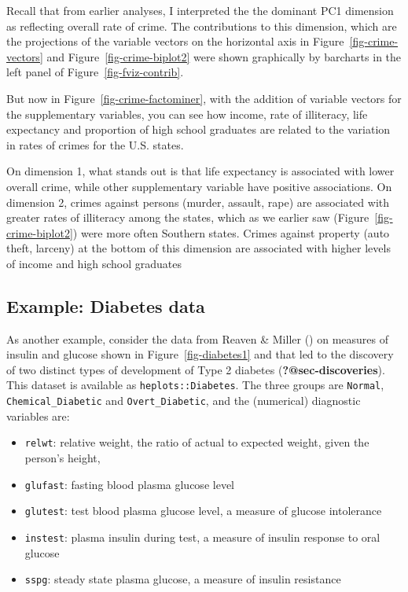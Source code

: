 \documentclass[
  letterpaper,
  10pt,
  krantz2]{krantz}
\providecommand{\tightlist}{%
  \setlength{\itemsep}{0pt}\setlength{\parskip}{0pt}}\usepackage{longtable,booktabs,array}
\begin{document}
Recall that from earlier analyses, I interpreted the the dominant PC1
dimension as reflecting overall rate of crime. The contributions to this
dimension, which are the projections of the variable vectors on the
horizontal axis in Figure~\ref{fig-crime-vectors} and
Figure~\ref{fig-crime-biplot2} were shown graphically by barcharts in
the left panel of Figure~\ref{fig-fviz-contrib}.

But now in Figure~\ref{fig-crime-factominer}, with the addition of
variable vectors for the supplementary variables, you can see how
income, rate of illiteracy, life expectancy and proportion of high
school graduates are related to the variation in rates of crimes for the
U.S. states.

On dimension 1, what stands out is that life expectancy is associated
with lower overall crime, while other supplementary variable have
positive associations. On dimension 2, crimes against persons (murder,
assault, rape) are associated with greater rates of illiteracy among the
states, which as we earlier saw (Figure~\ref{fig-crime-biplot2}) were
more often Southern states. Crimes against property (auto theft,
larceny) at the bottom of this dimension are associated with higher
levels of income and high school graduates

\subsection{Example: Diabetes data}\label{example-diabetes-data}

As another example, consider the data from Reaven \& Miller
() on measures of insulin and
glucose shown in Figure~\ref{fig-diabetes1} and that led to the
discovery of two distinct types of development of Type 2 diabetes
(\textbf{?@sec-discoveries}). This dataset is available as
\texttt{heplots::Diabetes}. The three groups are \texttt{Normal},
\texttt{Chemical\_Diabetic} and \texttt{Overt\_Diabetic}, and the
(numerical) diagnostic variables are:

\begin{itemize}
\tightlist
\item
  \texttt{relwt}: relative weight, the ratio of actual to expected
  weight, given the person's height,
\item
  \texttt{glufast}: fasting blood plasma glucose level
\item
  \texttt{glutest}: test blood plasma glucose level, a measure of
  glucose intolerance
\item
  \texttt{instest}: plasma insulin during test, a measure of insulin
  response to oral glucose
\item
  \texttt{sspg}: steady state plasma glucose, a measure of insulin
  resistance
\end{itemize}
\end{document}
